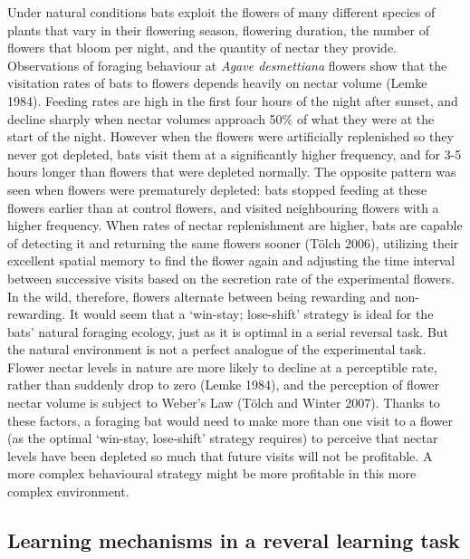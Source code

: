 \documentclass[
]{article}
\begin{document}
Under natural conditions bats exploit the flowers of many different species of plants that vary in their flowering season, flowering duration, the number of flowers that bloom per night, and the quantity of nectar they provide. Observations of foraging behaviour at \emph{Agave desmettiana} flowers show that the visitation rates of bats to flowers depends heavily on nectar volume (Lemke 1984). Feeding rates are high in the first four hours of the night after sunset, and decline sharply when nectar volumes approach 50\% of what they were at the start of the night. However when the flowers were artificially replenished so they never got depleted, bats visit them at a significantly higher frequency, and for 3-5 hours longer than flowers that were depleted normally. The opposite pattern was seen when flowers were prematurely depleted: bats stopped feeding at these flowers earlier than at control flowers, and visited neighbouring flowers with a higher frequency. When rates of nectar replenishment are higher, bats are capable of detecting it and returning the same flowers sooner (Tölch 2006), utilizing their excellent spatial memory to find the flower again and adjusting the time interval between successive visits based on the secretion rate of the experimental flowers. In the wild, therefore, flowers alternate between being rewarding and non-rewarding. It would seem that a `win-stay; lose-shift' strategy is ideal for the bats' natural foraging ecology, just as it is optimal in a serial reversal task. But the natural environment is not a perfect analogue of the experimental task. Flower nectar levels in nature are more likely to decline at a perceptible rate, rather than suddenly drop to zero (Lemke 1984), and the perception of flower nectar volume is subject to Weber's Law (Tölch and Winter 2007). Thanks to these factors, a foraging bat would need to make more than one visit to a flower (as the optimal `win-stay, lose-shift' strategy requires) to perceive that nectar levels have been depleted so much that future visits will not be profitable. A more complex behavioural strategy might be more profitable in this more complex environment.

\hypertarget{learning-mechanisms-in-a-reveral-learning-task}{%
\subsection{Learning mechanisms in a reveral learning task}\label{learning-mechanisms-in-a-reveral-learning-task}}
\end{document}
